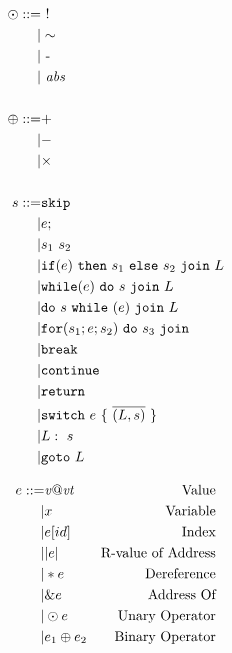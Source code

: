 \documentclass[acmsmall,review,anonymous]{acmart}\settopmatter{printfolios=true,printccs=false,printacmref=false}
\begin{document}
\begin{figure}
  \begin{subfigure}[t]{0.3\textwidth}
    \[\begin{aligned}
    \odot ::= & ~ ! \\
    | & \sim \\
    | & ~ \text{-} \\
    | & ~ \mathit{abs} \\ \\
    \oplus ::= & + \\
    | & - \\
    | & \times \\ \\
    s ::= & \mathtt{skip} \\
    | & e; \\
    | & s_1 ~ s_2 \\
    | & \mathtt{if}(e) ~ \mathtt{then} ~ s_1 ~ \mathtt{else} ~ s_2 ~ \mathtt{join} ~ L \\
    | & \mathtt{while}(e) ~ \mathtt{do} ~ s ~ \mathtt{join} ~ L \\
    | & \mathtt{do} ~ s ~ \mathtt{while} ~ (e) ~ \mathtt{join} ~ L \\
    | & \mathtt{for}(s_1; e; s_2) ~ \mathtt{do} ~ s_3 ~ \mathtt{join} ~ \\
    | & \mathtt{break} \\
    | & \mathtt{continue} \\
    | & \mathtt{return} \\
    | & \mathtt{switch} ~ e ~ \{ ~ \overline{(L,s)} ~ \} \\
    | & L: ~ s \\
    | & \mathtt{goto} ~ L \\    
    \end{aligned}\]
  \end{subfigure}
  \begin{subfigure}[t]{0.69\textwidth}
    \[\begin{aligned}
    \expr ::= & \val{v}{\vt} & \textnormal{Value} \\
    | & x & \textnormal{Variable} \\
    | & \expr [id] & \textnormal{Index} \\
    | & \valof{\expr} & \textnormal{R-value of Address} \\
    | & \deref{\expr} & \textnormal{Dereference} \\
    | & \addrof{\expr} & \textnormal{Address Of} \\
    | & \unop{\odot}{\expr} & \textnormal{Unary Operator} \\
    | & \binop{\oplus}{\expr_1}{\expr_2} & \textnormal{Binary Operator} \\

\end{aligned}\]
\end{subfigure}
\end{figure}
\end{document}
